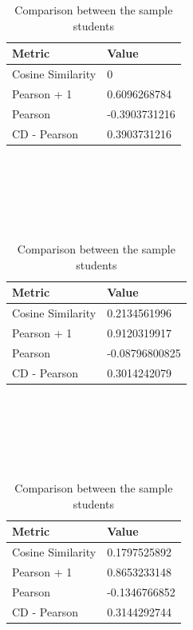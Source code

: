 \begin{table}[!htb]
\begin{subtable}{.5\linewidth}
    \end{subtable}
    \begin{subtable}{.5\linewidth}
      \centering
      
            \begin{tabular}{ll}
            \hline
            Metric            & Value         \\
            \hline
            Cosine Similarity & 0             \\
            Pearson + 1       & 0.6096268784  \\
            Pearson           & -0.3903731216 \\
            CD - Pearson      & 0.3903731216  \\
            \hline
            \end{tabular}\\
            \\
            \caption{Comparison between $S_1$ and $S_3$}\\
            \\
            
            \begin{tabular}{ll}
            \hline
            Metric            & Value         \\
            \hline
            Cosine Similarity & 0.2134561996  \\
            Pearson + 1       & 0.9120319917  \\
            Pearson           & -0.08796800825 \\
            CD - Pearson      & 0.3014242079   \\
            \hline
            \end{tabular}\\
            \\
            \caption{Comparison between $S_2$ and $S_4$}\\
            \\
            
            \begin{tabular}{ll}
            \hline
            Metric            & Value         \\
            \hline
            Cosine Similarity & 0.1797525892  \\
            Pearson + 1       & 0.8653233148  \\
            Pearson           & -0.1346766852 \\
            CD - Pearson      & 0.3144292744  \\
            \hline
            \end{tabular}\\
            \\
            \caption{Comparison between $S_1$ and $S_4$}\\
            \\
            
    \end{subtable} 
    \caption{Comparison between the sample students}
    \label{table:results_interests_comp}
\end{table}


